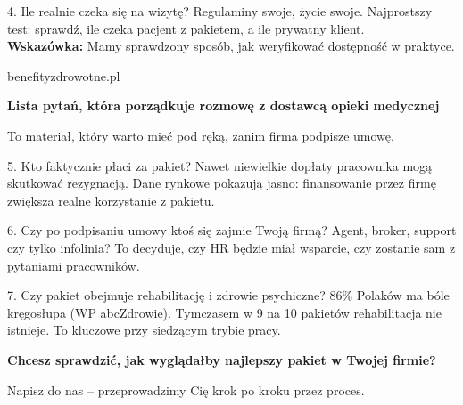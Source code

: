 \documentclass[11pt,a4paper]{article}
{
\small\color{textgray}Benefity Zdrowotne dla Firm \textbar{} praktyczne wdrożenia pakiet\'ow medycznych dla firm}
\newcommand{\checkicon}{\textcolor{mint}{\ding{51}}}
\newcommand{\question}[3]{%
\begin{questionbox}{\checkicon\hspace{0.5em}#1. #2}
{\small #3}
\end{questionbox}
}
\begin{document}
\question{4}{Ile realnie czeka si\k{e} na wizyt\k{e}?}{%
Regulaminy swoje, \.zycie swoje. Najprostszy test: sprawd\'z, ile czeka pacjent z pakietem, a ile prywatny klient.\\[0.35em]
{\color{branddark}\bfseries Wskaz\'owka:} Mamy sprawdzony spos\'ob, jak weryfikowa\'c dost\k{e}pno\'s\'c w praktyce.
}

\vfill
\begin{flushright}
  {\small\color{textgray}benefityzdrowotne.pl}
\end{flushright}

\newpage

\begin{tcolorbox}[
  enhanced,
  colback=white,
  colframe=border,
  arc=5mm,
  boxrule=0.8pt,
  left=12pt,
  right=12pt,
  top=8pt,
  bottom=8pt,
  before skip=0pt,
  after skip=4pt
]
{\large\bfseries\color{brand}Lista pyta\'n, kt\'ora porz\k{a}dkuje rozmow\k{e} z dostawc\k{a} opieki medycznej\par}
{\normalsize\color{textgray}To materia\l{}, kt\'ory warto mie\'c pod r\k{e}k\k{a}, zanim firma podpisze umow\k{e}.\par}
\end{tcolorbox}

\question{5}{Kto faktycznie p\l{}aci za pakiet?}{%
Nawet niewielkie dop\l{}aty pracownika mog\k{a} skutkowa\'c rezygnacj\k{a}. Dane rynkowe pokazuj\k{a} jasno:
finansowanie przez firm\k{e} zwi\k{e}ksza realne korzystanie z pakietu.
}

\question{6}{Czy po podpisaniu umowy kto\'s si\k{e} zajmie Twoj\k{a} firm\k{a}?}{%
Agent, broker, support czy tylko infolinia? To decyduje, czy HR b\k{e}dzie mia\l{} wsparcie,
czy zostanie sam z pytaniami pracownik\'ow.
}

\question{7}{Czy pakiet obejmuje rehabilitacj\k{e} i zdrowie psychiczne?}{%
86\% Polak\'ow ma b\'ole kr\k{e}gos\l{}upa (WP abcZdrowie). Tymczasem w 9 na 10 pakiet\'ow rehabilitacja nie istnieje.
To kluczowe przy siedz\k{a}cym trybie pracy.
}

\vspace{0.4em}
\begin{tcolorbox}[
  enhanced,
  colback=cta!8,
  colframe=cta!24,
  arc=6mm,
  boxrule=0.8pt,
  left=12pt,
  right=12pt,
  top=10pt,
  bottom=10pt
]
{\Large\bfseries\color{cta}Chcesz sprawdzi\'c, jak wygl\k{a}da\l{}by najlepszy pakiet w Twojej firmie?\par}
{\normalsize\color{branddark}Napisz do nas -- przeprowadzimy Ci\k{e} krok po kroku przez proces.\par}
\end{tcolorbox}
\end{document}
